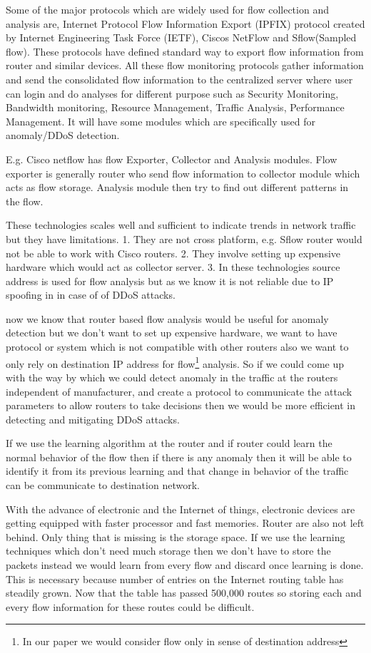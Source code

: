 \documentclass[10pt,oneside,a4paper]{report}
\begin{document}
Some of the major protocols which are widely used for flow collection and analysis are, Internet Protocol Flow Information Export (IPFIX) protocol created by Internet Engineering Task Force (IETF), Ciscos NetFlow\cite{cisconetflow} and Sflow(Sampled flow)\cite{sflow}. These protocols have defined standard way to export flow information from router and similar devices. All these flow monitoring protocols gather information and send the consolidated flow information to the centralized server where user can login and do analyses for different purpose such as Security Monitoring, Bandwidth monitoring, Resource Management, Traffic Analysis, Performance Management. It will have some modules which are specifically used for anomaly/DDoS detection.

E.g. Cisco netflow has flow Exporter, Collector and Analysis modules. Flow exporter is generally router who send flow information to collector module which acts as flow storage. Analysis module then try to find out different patterns in the flow.

These technologies scales well and sufficient to indicate trends in network traffic but they have limitations. 1. They are not cross platform, e.g. Sflow router would not be able to work with Cisco routers. 2. They involve setting up expensive hardware which would act as collector server. 3. In these technologies source address is used for flow analysis but as we know it is not reliable due to IP spoofing in in case of of DDoS attacks.

now we know that router based flow analysis would be useful for anomaly detection but we don't want to set up expensive hardware, we want to have protocol or system which is not compatible with other routers also we want to only rely on destination IP address for flow\footnote{In our paper we would consider flow only in sense of destination address} analysis. So if we could come up with the way by which we could detect anomaly in the traffic at the routers independent of manufacturer, and create a protocol to communicate the attack parameters to allow routers to take decisions then we would be more efficient in detecting and mitigating DDoS attacks.

If we use the learning algorithm at the router and if router could learn the normal behavior of the flow then if there is any anomaly then it will be able to identify it from its previous learning and that change in behavior of the traffic can be communicate to destination network.

With the advance of electronic and the Internet of things, electronic devices are getting equipped with faster processor and fast memories. Router are also not left behind. Only thing that is missing is the storage space. If we use the learning techniques which don't need much storage then we don't have to store the packets instead we would learn from every flow and discard once learning is done. This is necessary because number of entries on the Internet routing table has steadily grown.  Now that the table has passed 500,000 routes\cite{routingtablesize} so storing each and every flow information for these routes could be difficult.\par
\end{document}
